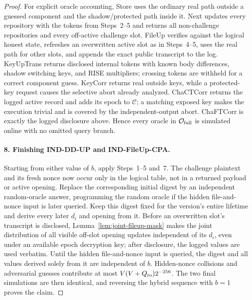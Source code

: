 \begin{proof}
For explicit oracle accounting, Store uses the ordinary real path outside a guessed component and the shadow/protected path inside it. Next updates every repository with the tokens from Steps~2--5 and returns all non-challenge repositories and every off-active challenge slot. FileUp verifies against the logical honest state, refreshes an overwritten active slot as in Steps~4--5, uses the real path for other slots, and appends the exact public transcript to the log. KeyUpTrans returns disclosed internal tokens with known body differences, shadow switching keys, and RISE multipliers; crossing tokens are withheld for a correct component guess. KeyCorr returns real outside keys, while a protected-key request causes the selective abort already analyzed. ChaCTCorr returns the logged active record and adds its epoch to $\mathcal C$; a matching exposed key makes the execution trivial and is covered by the independent-output abort. ChaFTCorr is exactly the logged disclosure above. Hence every oracle in $\mathcal O_{\rm full}$ is simulated online with no omitted query branch.

\paragraph{8. Finishing IND-DD-UP and IND-FileUp-CPA.}
Starting from either value of $b$, apply Steps~1--5 and~7. The challenge plaintext and its fresh nonce now occur only in the logical table, not in a returned payload or active opening. Replace the corresponding initial digest by an independent random-oracle answer, programming the random oracle if the hidden file-and-nonce input is later queried. Keep this digest fixed for the version's entire lifetime and derive every later $d_i$ and opening from it. Before an overwritten slot's transcript is disclosed, Lemma~\ref{lem:joint-fileup-mask} makes the joint distribution of all visible off-slot opening updates independent of its $d_i$, even under an available epoch decryption key; after disclosure, the logged values are used verbatim. Until the hidden file-and-nonce input is queried, the digest and all values derived solely from it are independent of $b$. Hidden-nonce collisions and adversarial guesses contribute at most $V(V+Q_{\rm ro})2^{-256}$. The two final simulations are then identical, and reversing the hybrid sequence with $b=1$ proves the claim.


\end{proof}
